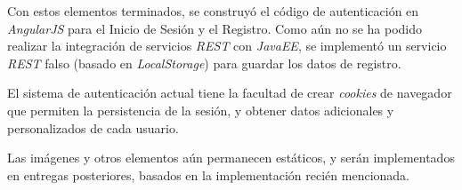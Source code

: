 \documentclass{memoria}
\begin{document}
Con estos elementos terminados, se construyó el código de autenticación en \textsl{AngularJS} para el Inicio de Sesión y el Registro. Como aún no se ha podido realizar la integración de servicios \textsl{REST} con \textsl{JavaEE}, se implementó un servicio \textsl{REST} falso (basado en \textsl{LocalStorage}) para guardar los datos de registro.


El sistema de autenticación actual tiene la facultad de crear \textsl{cookies} de navegador que permiten la persistencia de la sesión, y obtener datos adicionales y personalizados de cada usuario.


Las imágenes y otros elementos aún permanecen estáticos, y serán implementados en entregas posteriores, basados en la implementación recién mencionada.


\end{document}
